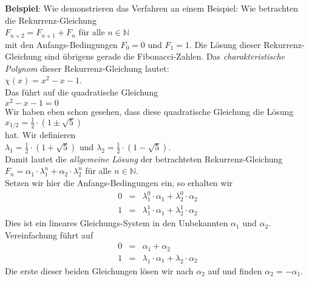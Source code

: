 \noindent
\textbf{Beispiel}:  Wie demonstrieren das Verfahren an einem Beispiel: Wie betrachten die
Rekurrenz-Gleichung \\[0.2cm]
\hspace*{1.3cm} $F_{n+2} = F_{n+1} + F_{n}$ \quad für alle $n \in \mathbb{N}$  \\[0.2cm]
mit den Anfangs-Bedingungen $F_0 = 0$ und $F_1 = 1$.  Die Lösung dieser
Rekurrenz-Gleichung sind übrigens gerade die Fibonacci-Zahlen.
Das \emph{charakteristische Polynom} dieser Rekurrenz-Gleichung lautet: \\[0.2cm]
\hspace*{1.3cm} $\chi(x) = x^2 - x - 1$.  \\[0.2cm]
Das führt auf die quadratische Gleichung \\[0.2cm]
\hspace*{1.3cm} $x^2 -x - 1 = 0$ \\[0.2cm]
Wir haben eben schon gesehen, dass diese quadratische Gleichung die Lösung \\[0.2cm]
\hspace*{1.3cm}
 $ x_{1/2} = \frac{1}{2} \cdot (1 \pm \sqrt{5})$ 
\\[0.2cm]
hat.  Wir definieren \\[0.2cm]
\hspace*{1.3cm} 
$\lambda_1 = \frac{1}{2} \cdot (1 + \sqrt{5})$ \quad und  \quad 
$\lambda_2 = \frac{1}{2} \cdot (1 - \sqrt{5})$. \\[0.2cm]
Damit lautet die \emph{allgemeine Lösung} der betrachteten Rekurrenz-Gleichung \\[0.2cm]
\hspace*{1.3cm}  $F_n = \alpha_1 \cdot \lambda_1^n  + \alpha_2 \cdot \lambda_2^n$ \quad für alle $n \in \mathbb{N}$. \\[0.2cm]
Setzen wir hier die Anfangs-Bedingungen ein, so erhalten wir
\[
\begin{array}{lcl}
    0 & = & \lambda_1^0 \cdot \alpha_1 + \lambda_2^0   \cdot \alpha_2 \\[0.2cm]
    1 & = & \lambda_1^1 \cdot \alpha_1 + \lambda_2^{1} \cdot \alpha_2 
\end{array}
\]
Dies ist ein lineares Gleichungs-System in den Unbekannten $\alpha_1$ und
$\alpha_2$. Vereinfachung führt auf 
\[
\begin{array}{lcl}
    0 & = & \alpha_1 + \alpha_2 \\[0.2cm]
    1 & = & \lambda_1 \cdot \alpha_1 + \lambda_2 \cdot \alpha_2 
\end{array}
\]
Die erste dieser beiden Gleichungen lösen wir nach $\alpha_2$ auf und finden  $\alpha_2 = - \alpha_1$.
